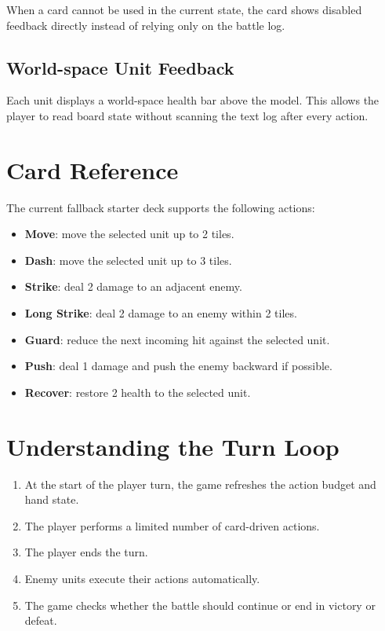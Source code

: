 When a card cannot be used in the current state, the card shows disabled feedback directly instead of relying only on the battle log.

\subsection{World-space Unit Feedback}

Each unit displays a world-space health bar above the model. This allows the player to read board state without scanning the text log after every action.

\section{Card Reference}

The current fallback starter deck supports the following actions:

\begin{itemize}
    \item \textbf{Move}: move the selected unit up to 2 tiles.
    \item \textbf{Dash}: move the selected unit up to 3 tiles.
    \item \textbf{Strike}: deal 2 damage to an adjacent enemy.
    \item \textbf{Long Strike}: deal 2 damage to an enemy within 2 tiles.
    \item \textbf{Guard}: reduce the next incoming hit against the selected unit.
    \item \textbf{Push}: deal 1 damage and push the enemy backward if possible.
    \item \textbf{Recover}: restore 2 health to the selected unit.
\end{itemize}

\section{Understanding the Turn Loop}

\begin{enumerate}
    \item At the start of the player turn, the game refreshes the action budget and hand state.
    \item The player performs a limited number of card-driven actions.
    \item The player ends the turn.
    \item Enemy units execute their actions automatically.
    \item The game checks whether the battle should continue or end in victory or defeat.
\end{enumerate}

